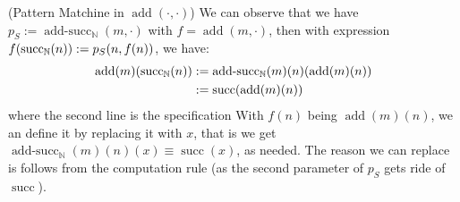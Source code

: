 \begin{remark}{(Pattern Matchine in $\operatorname{add}(\cdot, \cdot)$)}
    We can observe that we have $p_S:=\operatorname{add-succ}_\mathbb{N}(m, \cdot)$ with $f=\operatorname{add}(m, \cdot)$, then with expression $f(\operatorname{succ}_\mathbb{N}(n)) := p_S(n,f(n)) $, we have:
    \begin{equation*}
    \begin{aligned}
        \operatorname{add}(m)(\operatorname{succ}_\mathbb{N}(n)) &:= \operatorname{add-succ}_\mathbb{N}(m)(n)(\operatorname{add}(m)(n)) \\
        &:= \operatorname{succ}(\operatorname{add}(m)(n))
    \end{aligned}
    \end{equation*}
    where the second line is the specification
    With $f(n)$ being $\operatorname{add}(m)(n)$, we an define it by replacing it with $x$, that is we get $\operatorname{add-succ}_\mathbb{N}(m)(n)(x)\equiv\operatorname{succ}(x)$, as needed. The reason we can replace is follows from the computation rule (as the second parameter of $p_S$ gets ride of $\operatorname{succ}$).
\end{remark}


